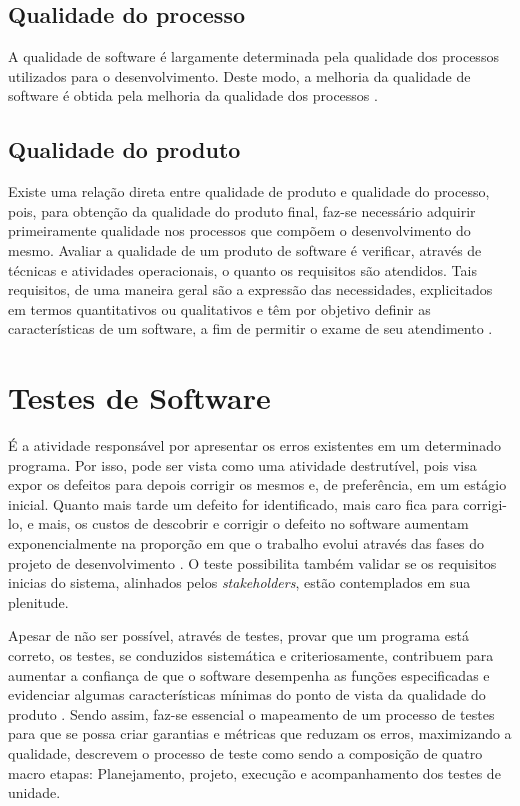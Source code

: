 \documentclass[tg]{mdtufsm}
\begin{document}
\subsection{Qualidade do processo}
A qualidade de software é largamente determinada pela qualidade dos processos utilizados para o desenvolvimento. Deste modo, a melhoria
da qualidade de software é obtida pela melhoria da qualidade dos processos \cite{koscianski2007qualidade}.

\subsection{Qualidade do produto}
Existe uma relação direta entre qualidade de produto e qualidade do processo, pois, para obtenção da qualidade do produto final,
faz-se necessário adquirir primeiramente qualidade nos processos que compõem o desenvolvimento do mesmo.
Avaliar a qualidade de um produto de software é verificar, através de técnicas e atividades operacionais, o quanto os requisitos são atendidos. Tais requisitos,
de uma maneira geral são a expressão das necessidades, explicitados em termos quantitativos ou qualitativos e têm por objetivo definir as características de
um software, a fim de permitir o exame de seu atendimento \cite{koscianski2007qualidade}.

\section{Testes de Software}
É a atividade responsável por apresentar os erros existentes em um determinado programa. Por isso, pode ser vista como uma atividade destrutível, pois visa expor os defeitos para depois corrigir os mesmos e, de preferência, em
um estágio inicial. Quanto mais tarde um defeito for identificado, mais caro fica para corrigi-lo, e mais, os custos de descobrir e corrigir o defeito no software aumentam exponencialmente na proporção em que o trabalho
evolui através das fases do projeto de desenvolvimento \cite{boehm1976quantitative}. O teste possibilita também validar se os requisitos inicias do sistema, alinhados pelos \emph{stakeholders}, estão contemplados em sua plenitude.

Apesar de não ser possível, através de testes, provar que um programa está correto, os testes, se conduzidos sistemática e criteriosamente, contribuem para
aumentar a confiança de que o software desempenha as funções especificadas e evidenciar algumas características mínimas do ponto de vista da qualidade do produto \cite{maldonado2004introduccao}. Sendo assim,
faz-se essencial o mapeamento de um processo de testes para que se possa criar garantias e métricas que reduzam os erros, maximizando a qualidade, \citeauthor{crespo2004metodologia} \cite{crespo2004metodologia} descrevem o processo de
teste como sendo a composição de quatro macro etapas: Planejamento, projeto, execução e acompanhamento dos testes de unidade.
\end{document}
